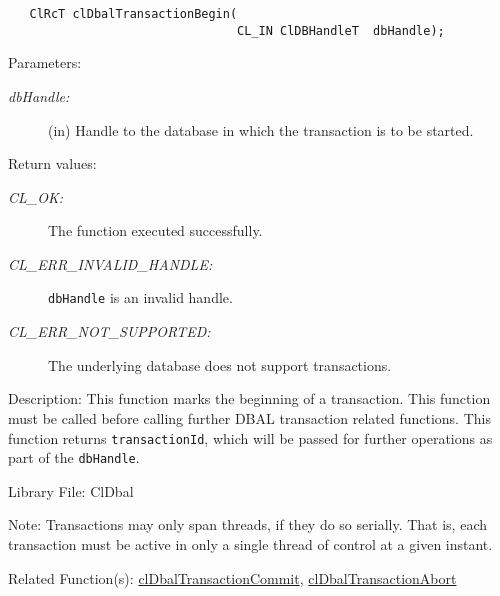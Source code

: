 \begin{flushleft}
\begin{Desc}
\footnotesize\begin{verbatim}   ClRcT clDbalTransactionBegin(
                          		CL_IN ClDBHandleT  dbHandle);
\end{verbatim}
\normalsize
\end{Desc}
\begin{Desc}
\item[Parameters:]
\begin{description}
\item[{\em db\-Handle:}](in) Handle to the database in which the transaction is to be started.\end{description}
\end{Desc}
\begin{Desc}
\item[Return values:]
\begin{description}
\item[{\em CL\_\-OK:}]The function executed successfully. 
\item[{\em CL\_\-ERR\_\-INVALID\_\-HANDLE:}]{\tt{dbHandle}} is an invalid handle. 
\item[{\em CL\_\-ERR\_\-NOT\_\-SUPPORTED:}]The underlying database does not support transactions.\end{description}
\end{Desc}
\begin{Desc}
\item[Description:]This function marks the beginning of a transaction. This function must be called before calling further DBAL transaction related
functions. This function returns {\tt{transaction\-Id}}, which will be passed for further operations as part of the {\tt{db\-Handle}}.\end{Desc}
\begin{Desc}
\item[Library File:]Cl\-Dbal\end{Desc}
\begin{Desc}
\item[Note:]Transactions may only span threads, if they do so serially. That is, each transaction must be active in only a single thread of control at a
given instant.\end{Desc}
\begin{Desc}
\item[Related Function(s):]\hyperlink{pagedbal112}{cl\-Dbal\-Transaction\-Commit}, 
\hyperlink{pagedbal113}{cl\-Dbal\-Transaction\-Abort} \end{Desc}


\newpage

\end{flushleft}
